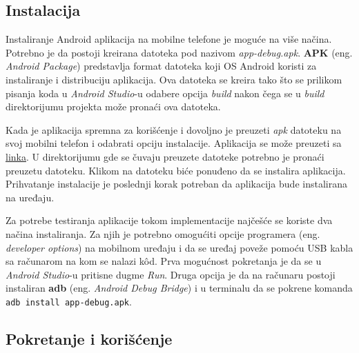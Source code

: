 \documentclass[implementacija.tex]{subfiles}
\begin{document}
\subsection{Instalacija}
Instaliranje Android aplikacija na mobilne telefone je moguće na više načina. Potrebno je da postoji kreirana datoteka pod nazivom \textit{app-debug.apk}. \textbf{APK} (eng. \textit{Android Package}) predstavlja format datoteka koji OS Android koristi za instaliranje i distribuciju aplikacija. Ova datoteka se kreira tako što se prilikom pisanja koda u \textit{Android Studio}-u odabere opcija \textit{build} nakon čega se u \textit{build} direktorijumu projekta može pronaći ova datoteka.

Kada je aplikacija spremna za korišćenje i dovoljno je preuzeti \textit{apk} datoteku na svoj mobilni telefon i odabrati opciju instalacije. Aplikacija se može preuzeti sa \hyperlink{https://drive.google.com/file/d/1gBlfRibn4jrFDe3TTBCsHUq9MDowEBty/view?usp=share_link}{linka}. U direktorijumu gde se čuvaju preuzete datoteke potrebno je pronaći preuzetu datoteku. Klikom na datoteku biće ponuđeno da se instalira aplikacija. Prihvatanje instalacije je poslednji korak potreban da aplikacija bude instalirana na uređaju.

Za potrebe testiranja aplikacije tokom implementacije najčešće se koriste dva načina instaliranja. Za njih je potrebno omogućiti opcije programera (eng. \textit{developer options}) na mobilnom uređaju i da se uređaj poveže pomoću USB kabla sa računarom na kom se nalazi k\^{o}d. Prva mogućnost pokretanja je da se u \textit{Android Studio}-u pritisne dugme \textit{Run}. Druga opcija je da na računaru postoji instaliran \textbf{adb} (eng. \textit{Android Debug Bridge}) i u terminalu da se pokrene komanda \verb|adb install app-debug.apk|. 

\subsection{Pokretanje i korišćenje}
\end{document}
